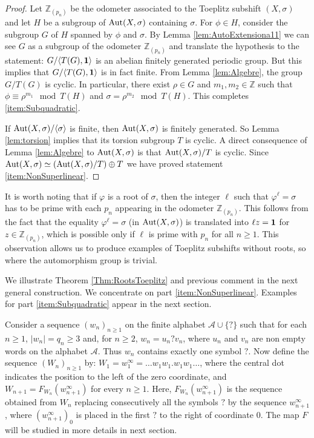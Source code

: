 \documentclass{daj}
\theoremstyle{plain}
\theoremstyle{definition}
\begin{document}
\begin{proof}
	Let $\mathbb{Z}_{(p_n)}$ be the odometer associated to the Toeplitz subshift $(X,\sigma)$ and let  $H$ be a subgroup of ${\rm Aut}(X,\sigma)$ containing $\sigma$. 
	For $\phi \in H$, consider the subgroup $G$ of $H$ spanned by $\phi$ and $\sigma$. 
	By Lemma \ref{lem:AutoExtensiona11} we can see $G$ as a subgroup of the odometer $\mathbb{Z}_{(p_n)}$ and translate the hypothesis to the statement: $G/\langle T(G), {\bf 1} \rangle$ is an abelian finitely generated periodic group. But this implies that  $G/\langle  T(G) , {\bf 1} \rangle$ is in fact finite.  From Lemma \ref{lem:Algebre}, the group  $G\slash T(G)$ is cyclic. In particular, there exist $\rho \in G$ and $m_1,m_2 \in \mathbb{Z}$ such that $\phi \equiv \rho ^{m_1} \mod T(H)$ and $\sigma=\rho^{m_2} \mod T(H)$. This completes \eqref{item:Subquadratic}.
	
	If ${\rm Aut}(X,\sigma)/\langle  \sigma  \rangle $ is finite, then ${\rm Aut}(X,\sigma)$ is finitely generated. So Lemma \ref{lem:torsion} implies that its torsion subgroup $T$ is cyclic. 
	A direct consequence of  Lemma \ref{lem:Algebre} to ${\rm Aut}(X, \sigma)$ is that ${\rm Aut}(X,\sigma)/ T$ is cyclic.  Since ${\rm Aut}(X,\sigma) \simeq  \left({\rm Aut}(X,\sigma)/ T \right) \oplus T$ we have proved statement \eqref{item:NonSuperlinear}. 
\end{proof}

It is worth noting that if $\varphi$ is a root of $\sigma$, then the integer $\ell$ such that $\varphi^\ell=\sigma$ has to be prime with each $p_n$ appearing in the odometer $\mathbb{Z}_{(p_{n})}$. This follows from the fact that the equality 
$\varphi^\ell=\sigma$ (in ${\rm Aut}(X,\sigma)$) is translated into $\ell z={\bf 1}$ for $z \in \mathbb{Z}_{(p_{n})}$, which is possible only if $\ell$ is prime with $p_n$ for all $n\geq 1$. 
This observation allows us to produce examples of Toeplitz subshifts without roots, so where the automorphism group is trivial.

We illustrate Theorem \ref{Thm:RootsToeplitz} and previous comment in the next general construction. We concentrate on part \eqref{item:NonSuperlinear}. Examples for part \eqref{item:Subquadratic} appear in the next section. 

Consider a sequence $(w_n)_{n\geq 1}$ on the finite alphabet $\mathcal{A}\cup \{ \text{?} \}$ such that for each $n\geq 1$, $|w_n| = q_n\geq 3$ and, for $n\geq 2$, $w_n=u_n?v_n$, where $u_n$ and $v_n$ are non empty words on the alphabet $\mathcal{A}$. Thus $w_n$ contains exactly one  symbol $?$.
Now define the sequence $(W_n)_{n\geq 1}$ by: $W_1=w_1 ^\infty=\ldots w_1w_1.w_1w_1\ldots$, where the central dot indicates the position to the left of the zero coordinate, and 
$W_{n+1}=F_{W_n}(w_{n+1}^{\infty})$ for every $n\geq 1$. Here, $F_{W_n}(w_{n+1}^{\infty})$
is the sequence obtained from $W_n$ replacing consecutively all the symbols $?$ by the sequence 
$w_{n+1}^{\infty}$, where $(w_{n+1}^{\infty})_0$ is placed in the first $?$ to the right of  coordinate $0$. The map $F$ will be studied in more details in next section. 
\end{document}
